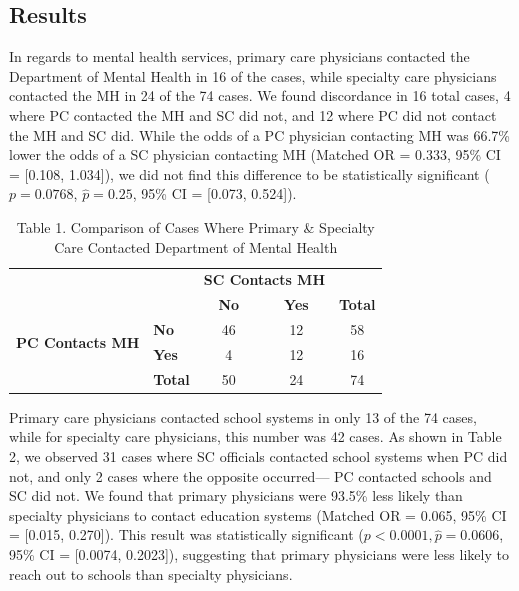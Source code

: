 \documentclass{article}
\begin{document}
	\subsection*{Results}
	In regards to mental health services, primary care physicians contacted the Department of Mental Health in 16 of the cases, while specialty care physicians contacted the MH in 24 of the 74 cases. We found discordance in 16 total cases, 4 where PC contacted the MH and SC did not, and 12 where PC did not contact the MH and SC did. While the odds of a PC physician contacting MH was 66.7\% lower the odds of a SC physician contacting MH (Matched OR = 0.333,  95\% CI = [0.108, 1.034]), we did not find this difference to be statistically significant ($p = 0.0768$, $\hat{p} = 0.25$, 95\% CI = [0.073, 0.524]).



	\begin{table}[h]
		\centering
		\footnotesize
		\captionsetup{labelformat=empty}
		\caption{Table 1. Comparison of Cases Where Primary \& Specialty Care Contacted Department of Mental Health}
		\renewcommand{\arraystretch}{1.2}
		\begin{tabular}{llccc}
			\toprule
			& & \multicolumn{2}{c}{\textbf{SC Contacts MH}} & \\  
			\cmidrule(lr){3-4}
			& & \textbf{No} & \textbf{Yes} & \textbf{Total} \\  
			\midrule
			\multirow{2}{*}{\textbf{PC Contacts MH}} & \textbf{No} & 46 & 12 & 58 \\  
			& \textbf{Yes} & 4 & 12 & 16 \\  
			\midrule
			& \textbf{Total} & 50 & 24 & 74 \\  
			\bottomrule
		\end{tabular}
		\label{tab:pc_sc_mh}
	\end{table}


	Primary care physicians contacted school systems in only 13 of the 74 cases, while for specialty care physicians, this number was 42 cases. As shown in Table 2, we observed 31 cases where SC officials contacted school systems when PC did not, and only 2 cases where the opposite occurred— PC contacted schools and SC did not. We found that primary physicians were 93.5\% less likely than specialty physicians to contact education systems (Matched OR = 0.065, 95\% CI = [0.015, 0.270]). This result was statistically significant ($p < 0.0001, \hat{p} = 0.0606$, 95\% CI = [0.0074, 0.2023]), suggesting that primary physicians were less likely to reach out to schools than specialty physicians.
\end{document}
